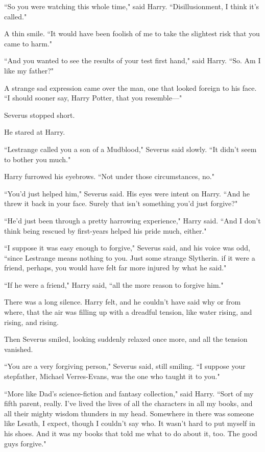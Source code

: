 ``So you were watching this whole time," said Harry. ``Disillusionment, I think it's called."

A thin smile. ``It would have been foolish of me to take the slightest risk that you came to harm."

``And you wanted to see the results of your test first hand," said Harry. ``So. Am I like my father?"

A strange sad expression came over the man, one that looked foreign to his face. ``I should sooner say, Harry Potter, that you resemble—"

Severus stopped short.

He stared at Harry.

``Lestrange called you a son of a Mudblood," Severus said slowly. ``It didn't seem to bother you much."

Harry furrowed his eyebrows. ``Not under those circumstances, no."

``You'd just helped him," Severus said. His eyes were intent on Harry. ``And he threw it back in your face. Surely that isn't something you'd just forgive?"

``He'd just been through a pretty harrowing experience," Harry said. ``And I don't think being rescued by first-years helped his pride much, either."

``I suppose it was easy enough to forgive," Severus said, and his voice was odd, ``since Lestrange means nothing to you. Just some strange Slytherin. if it were a friend, perhaps, you would have felt far more injured by what he said."

``If he were a friend," Harry said, ``all the more reason to forgive him."

There was a long silence. Harry felt, and he couldn't have said why or from where, that the air was filling up with a dreadful tension, like water rising, and rising, and rising.

Then Severus smiled, looking suddenly relaxed once more, and all the tension vanished.

``You are a very forgiving person," Severus said, still smiling. ``I suppose your stepfather, Michael Verres-Evans, was the one who taught it to you."

``More like Dad's science-fiction and fantasy collection," said Harry. ``Sort of my fifth parent, really. I've lived the lives of all the characters in all my books, and all their mighty wisdom thunders in my head. Somewhere in there was someone like Lesath, I expect, though I couldn't say who. It wasn't hard to put myself in his shoes. And it was my books that told me what to do about it, too. The good guys forgive."

